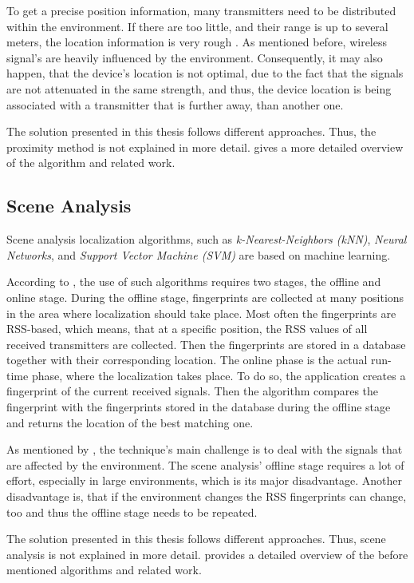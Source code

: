 To get a precise position information, many transmitters need to be distributed within the environment. If there are too little, and their range is up to several meters, the location information is very rough \citep{kotanen:exp_local_pos_bt}. As mentioned before, wireless signal's are heavily influenced by the environment. Consequently, it may also happen, that the device's location is not optimal, due to the fact that the signals are not attenuated in the same strength, and thus, the device location is being associated with a transmitter that is further away, than another one.

The solution presented in this thesis follows different approaches. Thus, the proximity method is not explained in more detail. \citet{IEEE:survey_wireless_indoor_pos} gives a more detailed overview of the algorithm and related work.

\subsection{Scene Analysis}\label{sec:fund_sceneanalysis}
Scene analysis localization algorithms, such as \emph{k-Nearest-Neighbors (kNN)}, \emph{Neural Networks}, and \emph{Support Vector Machine (SVM)} are based on machine learning.

According to \citet{IEEE:survey_wireless_indoor_pos}, the use of such algorithms requires two stages, the offline and online stage. During the offline stage, fingerprints are collected at many positions in the area where localization should take place. Most often the fingerprints are \acs{RSS}-based, which means, that at a specific position, the \ac{RSS} values of all received transmitters are collected. Then the fingerprints are stored in a database together with their corresponding location. The online phase is the actual run-time phase, where the localization takes place. To do so, the application creates a fingerprint of the current received signals. Then the algorithm compares the fingerprint with the fingerprints stored in the database during the offline stage and returns the location of the best matching one.

As mentioned by \citet{IEEE:survey_wireless_indoor_pos}, the technique's main challenge is to deal with the signals that are affected by the environment. The scene analysis' offline stage requires a lot of effort, especially in large environments, which is its major disadvantage. Another disadvantage is, that if the environment changes the \ac{RSS} fingerprints can change, too and thus the offline stage needs to be repeated.

The solution presented in this thesis follows different approaches. Thus, scene analysis is not explained in more detail. \citet{IEEE:survey_wireless_indoor_pos} provides a detailed overview of the before mentioned algorithms and related work.
